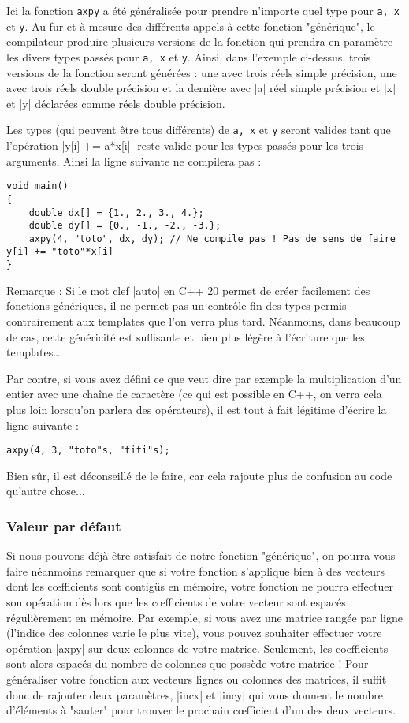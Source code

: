 Ici la fonction \texttt{axpy} a été généralisée pour prendre n'importe quel type pour \texttt{a, x} et \texttt{y}.
Au fur et à mesure des différents appels à cette fonction "générique", le compilateur produire plusieurs versions de la fonction qui prendra en paramètre les divers types passés pour \texttt{a, x} et \texttt{y}. Ainsi, dans l'exemple ci-dessus,
trois versions de la fonction seront générées : une avec trois réels simple précision, une avec trois réels double précision et la dernière avec |a| réel simple précision et |x| et |y| déclarées comme réels double précision.

Les types (qui peuvent être tous différents) de \texttt{a, x} et \texttt{y}
seront valides tant que l'opération |y[i] += a*x[i]| reste valide pour les types passés pour les trois arguments. Ainsi la ligne suivante ne compilera pas :

\begin{lstlisting}
void main()
{
    double dx[] = {1., 2., 3., 4.};
    double dy[] = {0., -1., -2., -3.};
    axpy(4, "toto", dx, dy); // Ne compile pas ! Pas de sens de faire y[i] += "toto"*x[i]  
}
\end{lstlisting}

\underline{Remarque} : Si le mot clef |auto| en C++ 20 permet de créer facilement des fonctions génériques, il ne permet pas un contrôle fin des types permis contrairement aux templates que l'on verra plus tard. Néanmoins, dans beaucoup de cas, cette
généricité est suffisante et bien plus légère à l'écriture que les templates\ldots

Par contre, si vous avez défini ce que veut dire par exemple la multiplication d'un entier
avec une chaîne de caractère (ce qui est possible en C++, on verra cela plus loin lorsqu'on parlera des opérateurs), il est tout à fait légitime d'écrire la ligne suivante :
\begin{lstlisting}
axpy(4, 3, "toto"s, "titi"s);
\end{lstlisting}

Bien sûr, il est déconseillé de le faire, car cela rajoute plus de confusion au code qu'autre chose...

\subsubsection{Valeur par défaut}

Si nous pouvons déjà être satisfait de notre fonction "générique", on pourra vous faire
néanmoins remarquer que si votre fonction s'applique bien à des vecteurs dont les c{\oe}fficients sont contigüs en mémoire, votre fonction ne pourra effectuer son opération dès lors que les c{\oe}fficients de votre vecteur sont espacés régulièrement en mémoire. Par exemple, si vous avez une matrice rangée par ligne (l'indice des colonnes varie le plus vite), vous pouvez souhaiter effectuer votre opération |axpy| sur deux colonnes de votre matrice. Seulement, les coefficients sont alors espacés du nombre de colonnes que possède votre matrice ! Pour généraliser votre fonction aux vecteurs lignes ou colonnes des matrices, il suffit donc de rajouter deux paramètres, |incx| et |incy| qui vous donnent
le nombre d'éléments à "sauter" pour trouver le prochain c{\oe}fficient d'un des deux vecteurs.

